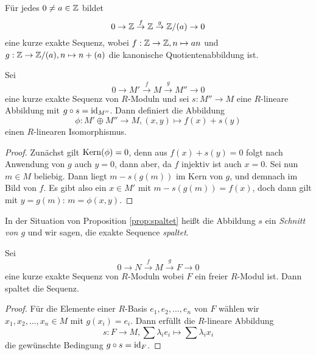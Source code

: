 \documentclass{book}
\begin{document}
\begin{exa}
    \label{exa:ses}
    Für jedes $0 \ne a \in \mathbb{Z}$ bildet
    \[
        0 \to \mathbb{Z} \overset{f}{\to} \mathbb{Z} \overset{g}{\to} \mathbb{Z}/(a) \to 0
    \]
    eine kurze exakte Sequenz, wobei $f: \mathbb{Z} \to \mathbb{Z}, n \mapsto an$ und $g: \mathbb{Z}
    \to \mathbb{Z}/(a), n \mapsto n + (a)$ die kanonische Quotientenabbildung ist. 
\end{exa}

\begin{prop}
    \label{prop:spaltet} Sei 
    \[
        0 \to M' \overset{f}{\to} M \overset{g}{\to} M'' \to 0
    \]
    eine kurze exakte Sequenz von $R$-Moduln und sei $s: M'' \to M$ eine
    $R$-lineare Abbildung mit $g \circ s = \operatorname{id}_{M''}$. Dann definiert die Abbildung
    \begin{equation}
        \label{eq:splitsum}
            \phi: M' \oplus M'' \to M, (x,y) \mapsto f(x) + s(y)
    \end{equation}
    einen $R$-linearen Isomorphismus.
\end{prop}
\begin{proof}
    Zunächst gilt $\Kern(\phi) = 0$, denn aus $f(x) + s(y) = 0$ folgt nach
    Anwendung von $g$ auch $y=0$, dann aber, da $f$ injektiv ist auch $x=0$.
    Sei nun $m \in M$ beliebig. Dann liegt $m - s(g(m))$ im Kern von $g$, und
    demnach im Bild von $f$. Es gibt also ein $x \in M'$ mit $m - s(g(m)) =
    f(x)$, doch dann gilt mit $y = g(m)$: $m = \phi(x,y)$. 
\end{proof}

\begin{rem}
    \label{rem:spaltet}
    In der Situation von Proposition \ref{prop:spaltet} heißt die Abbildung $s$
    ein {\em Schnitt von $g$} und wir sagen, die exakte Sequence {\em spaltet}.
\end{rem}

\begin{prop}
    \label{prop:freesplit}
    Sei 
    \[
        0 \to N \overset{f}{\to} M \overset{g}{\to} F \to 0
    \]
    eine kurze exakte Sequenz von $R$-Moduln wobei $F$ ein freier $R$-Modul ist.
    Dann spaltet die Sequenz. 
\end{prop}
\begin{proof}
    Für die Elemente einer $R$-Basis $e_1, e_2, ..., e_n$ von $F$ wählen wir
    $x_1, x_2, ..., x_n \in M$ mit $g(x_i) = e_i$. Dann erfüllt die $R$-lineare Abbildung
    \[
        s: F \to M, \sum \lambda_i e_i \mapsto \sum \lambda_i x_i
    \]
    die gewünschte Bedingung $g \circ s = \operatorname{id}_F$. 
\end{proof}
\end{document}
